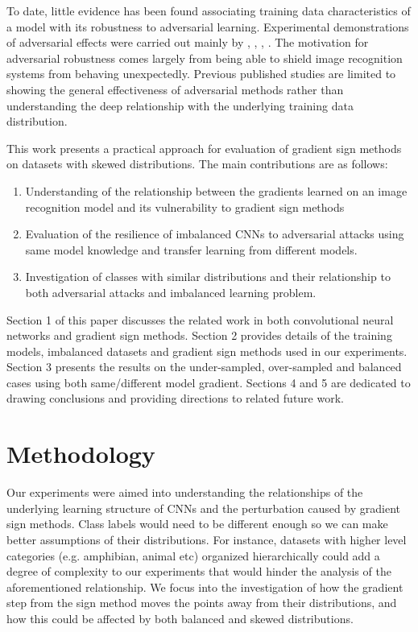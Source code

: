 \documentclass[runningheads,a4paper]{llncs}
\begin{document}
To date, little evidence has been found associating training data characteristics of a model with its robustness to adversarial learning. Experimental demonstrations of adversarial effects were carried out mainly by \cite{billovits}, \cite{goodfellow2014}, \cite{goodfellow2016}, \cite{papernot2016}. The motivation for adversarial robustness comes largely from being able to shield image recognition systems from behaving unexpectedly. Previous published studies are limited to showing the general effectiveness of adversarial methods rather than understanding the deep relationship with the underlying training data distribution.

This work presents a practical approach for evaluation of gradient sign methods on datasets with skewed distributions. The main contributions are as follows:
\begin{enumerate}
\item Understanding of the relationship between the gradients learned on an image recognition model and its vulnerability to gradient sign methods
\item Evaluation of the resilience of imbalanced CNNs to adversarial attacks using same model knowledge and transfer learning from different models.
\item Investigation of classes with similar distributions and their relationship to both adversarial attacks and imbalanced learning problem.
\end{enumerate}

Section 1 of this paper discusses the related work in both convolutional neural networks and gradient sign methods. Section 2 provides details of the training models, imbalanced datasets and gradient sign methods used in our experiments. Section 3 presents the results on the under-sampled, over-sampled and balanced cases using both same/different model gradient. Sections 4 and 5 are dedicated to drawing conclusions and providing directions to related future work.


\section{Methodology}

Our experiments were aimed into understanding the relationships of the underlying learning structure of CNNs and the perturbation caused by gradient sign methods. Class labels would need to be different enough so we can make better assumptions of their distributions. For instance, datasets with higher level categories (e.g. amphibian, animal etc) organized hierarchically could add a degree of complexity to our experiments that would hinder the analysis of the aforementioned relationship. We focus into the investigation of how the gradient step from the sign method moves the points away from their distributions, and how this could be affected by both balanced and skewed distributions.
\end{document}
